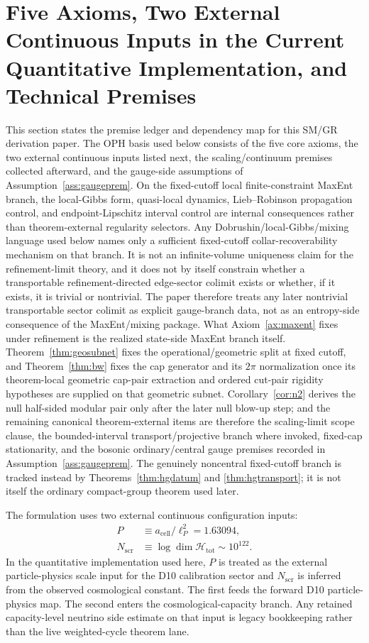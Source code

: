 \documentclass[11pt]{article}
\begin{document}
\section{Five Axioms, Two External Continuous Inputs in the Current Quantitative Implementation, and Technical Premises}\label{sec:premise-ledger}

This section states the premise ledger and dependency map for this SM/GR derivation paper. The OPH basis used below consists of the five core axioms, the two external continuous inputs listed next, the scaling/continuum premises collected afterward, and the gauge-side assumptions of Assumption~\ref{ass:gaugeprem}. On the fixed-cutoff local finite-constraint MaxEnt branch, the local-Gibbs form, quasi-local dynamics, Lieb--Robinson propagation control, and endpoint-Lipschitz interval control are internal consequences rather than theorem-external regularity selectors. Any Dobrushin/local-Gibbs/mixing language used below names only a sufficient fixed-cutoff collar-recoverability mechanism on that branch. It is not an infinite-volume uniqueness claim for the refinement-limit theory, and it does not by itself constrain whether a transportable refinement-directed edge-sector colimit exists or whether, if it exists, it is trivial or nontrivial. The paper therefore treats any later nontrivial transportable sector colimit as explicit gauge-branch data, not as an entropy-side consequence of the MaxEnt/mixing package. What Axiom~\ref{ax:maxent} fixes under refinement is the realized state-side MaxEnt branch itself. Theorem~\ref{thm:geosubnet} fixes the operational/geometric split at fixed cutoff, and Theorem~\ref{thm:bw} fixes the cap generator and its \(2\pi\) normalization once its theorem-local geometric cap-pair extraction and ordered cut-pair rigidity hypotheses are supplied on that geometric subnet. Corollary~\ref{cor:n2} derives the null half-sided modular pair only after the later null blow-up step; and the remaining canonical theorem-external items are therefore the scaling-limit scope clause, the bounded-interval transport/projective branch where invoked, fixed-cap stationarity, and the bosonic ordinary/central gauge premises recorded in Assumption~\ref{ass:gaugeprem}. The genuinely noncentral fixed-cutoff branch is tracked instead by Theorems~\ref{thm:hgdatum} and \ref{thm:hgtransport}; it is not itself the ordinary compact-group theorem used later.

The formulation uses two external continuous configuration inputs:
\begin{align}
P &\equiv a_{\mathrm{cell}}/\ell_P^2 = 1.63094,\\
N_{\mathrm{scr}} &\equiv \log \dim \mathcal H_{\mathrm{tot}} \sim 10^{122}.
\end{align}
In the quantitative implementation used here, \(P\) is treated as the external particle-physics scale input for the D10 calibration sector and \(N_{\mathrm{scr}}\) is inferred from the observed cosmological constant. The first feeds the forward D10 particle-physics map. The second enters the cosmological-capacity branch. Any retained capacity-level neutrino side estimate on that input is legacy bookkeeping rather than the live weighted-cycle theorem lane.
\end{document}
